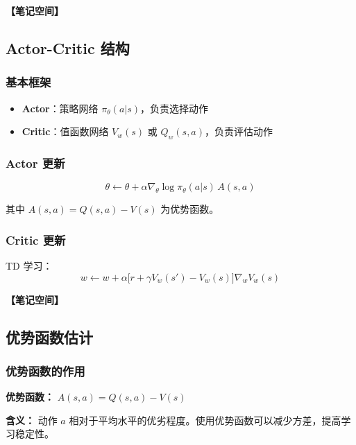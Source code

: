 \documentclass[12pt,a4paper]{article}
\newcommand{\notespace}[1][3cm]{%
  \vspace{#1}%
  \noindent\textbf{【笔记空间】}%
  \vspace{#1}%
}
\newcommand{\1}{\mathbf{1}}
\begin{document}
\notespace[2cm]

\subsection{Actor-Critic 结构}

\subsubsection*{基本框架}

\begin{itemize}[leftmargin=2em]
  \item \textbf{Actor}：策略网络 $\pi_\theta(a|s)$，负责选择动作
  \item \textbf{Critic}：值函数网络 $V_w(s)$ 或 $Q_w(s,a)$，负责评估动作
\end{itemize}

\subsubsection*{Actor 更新}

\begin{equation}
\theta\leftarrow\theta+\alpha\nabla_\theta\log\pi_\theta(a|s)\,A(s,a)
\end{equation}

其中 $A(s,a)=Q(s,a)-V(s)$ 为优势函数。

\subsubsection*{Critic 更新}

TD 学习：
\begin{equation}
w\leftarrow w+\alpha\bigl[r+\gamma V_w(s')-V_w(s)\bigr]\nabla_w V_w(s)
\end{equation}

\notespace[2cm]

\subsection{优势函数估计}

\subsubsection*{优势函数的作用}

\begin{keybox}
\textbf{优势函数：} $A(s,a)=Q(s,a)-V(s)$

\textbf{含义：} 动作 $a$ 相对于平均水平的优劣程度。使用优势函数可以减少方差，提高学习稳定性。
\end{keybox}
\end{document}
